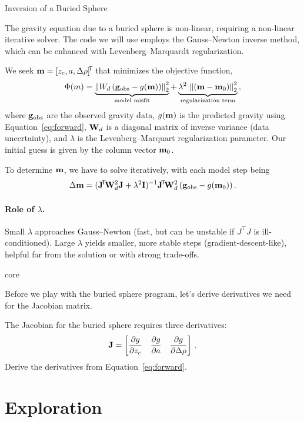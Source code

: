 \begin{activity}{Inversion of a Buried Sphere}
{    The gravity equation due to a buried sphere is non-linear, requiring a non-linear iterative solver. The code we will use employs the Gauss--Newton inverse method, which can be enhanced with Levenberg--Marquardt regularization.

    We seek $\vb{m} = [z_c, a, \Delta\rho]\!^\mathsf{T}\!$ that minimizes the objective function,
    \[
        \Phi(m) = \underbrace{\left\| W_d\,(\vb{g}_{\mathrm{obs}} - g(\vb{m})) \right\|_2^2}_{\text{model misfit}} + \underbrace{\lambda^2\,\left\| (\vb{m} - \vb{m}_{0}) \right\|_2^2}_{\text{regularization term}}\, ,
    \]
    where $\vb{g}_{\mathrm{obs}}$ are the observed gravity data, $g(\vb{m})$ is the predicted gravity using Equation~\ref{eq:forward}, $\vb{W}_d$ is a diagonal matrix of inverse variance (data uncertainty), and $\lambda$ is the Levenberg--Marquart regularization parameter.  Our initial guess is given by the column vector $\vb{m}_0$.

    To determine $\vb{m}$, we have to solve iteratively, with each model step being
    \[
        \Delta \vb{m} = (\vb{J}\!^\mathsf{T}\! \vb{W}_d^2 \vb{J} + \lambda^2 \vb{I})^{-1} 
        \vb{J}\!^\mathsf{T}\! \vb{W}_d^2 \, (\vb{g}_{\mathrm{obs}} - g(\vb{m}_0))\, .
    \]

    \paragraph{Role of $\lambda$.} Small $\lambda$ approaches Gauss--Newton (fast, but can be unstable if $J^\top J$ is ill-conditioned). Large $\lambda$ yields smaller, more stable steps (gradient-descent-like), helpful far from the solution or with strong trade-offs.
}{core}

\begin{questions}
    Before we play with the buried sphere program, let's derive derivatives we need for the Jacobian matrix.

    The Jacobian for the buried sphere requires three derivatives:
    \[
        \vb{J} =
        \begin{bmatrix} 
            \displaystyle{\pdv{g}{z_c}} & \displaystyle{\pdv{g}{a}} & \displaystyle{\pdv{g}{\Delta\rho}}
        \end{bmatrix}\, .
    \]
    Derive the derivatives from Equation~\ref{eq:forward}.
    \answerbox[460pt]
\end{questions}
\section*{Exploration}


\end{activity}
